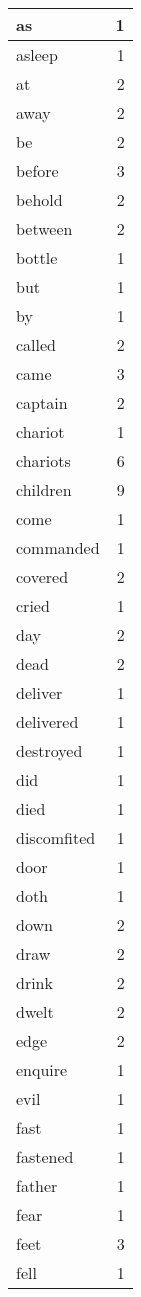 \begin{center}
\begin{longtable}{l|r}
as & 1\\ \hline 
asleep & 1\\ \hline 
at & 2\\ \hline 
away & 2\\ \hline 
be & 2\\ \hline 
before & 3\\ \hline 
behold & 2\\ \hline 
between & 2\\ \hline 
bottle & 1\\ \hline 
but & 1\\ \hline 
by & 1\\ \hline 
called & 2\\ \hline 
came & 3\\ \hline 
captain & 2\\ \hline 
chariot & 1\\ \hline 
chariots & 6\\ \hline 
children & 9\\ \hline 
come & 1\\ \hline 
commanded & 1\\ \hline 
covered & 2\\ \hline 
cried & 1\\ \hline 
day & 2\\ \hline 
dead & 2\\ \hline 
deliver & 1\\ \hline 
delivered & 1\\ \hline 
destroyed & 1\\ \hline 
did & 1\\ \hline 
died & 1\\ \hline 
discomfited & 1\\ \hline 
door & 1\\ \hline 
doth & 1\\ \hline 
down & 2\\ \hline 
draw & 2\\ \hline 
drink & 2\\ \hline 
dwelt & 2\\ \hline 
edge & 2\\ \hline 
enquire & 1\\ \hline 
evil & 1\\ \hline 
fast & 1\\ \hline 
fastened & 1\\ \hline 
father & 1\\ \hline 
fear & 1\\ \hline 
feet & 3\\ \hline 
fell & 1\\ \hline 

\end{longtable}
\end{center}
